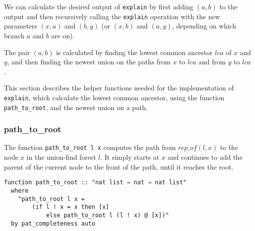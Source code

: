 \begin{center}
\end{center}

We can calculate the desired output of \lstinline|explain| by first adding  $(a, b)$ to the output and then recursively calling the \lstinline|explain| operation with the new parameters $(x, a)$ and $(b, y)$ (or $(x, b)$ and $(a, y)$, depending on which branch $a$ and $b$ are on).

The pair $(a, b)$ is calculated by finding the lowest common ancestor $lca$ of $x$ and $y$, and then finding the newest union on the paths from $x$ to $lca$ and from $y$ to $lca$.

This section describes the helper functions needed for the implementation of \lstinline|explain|, which calculate the lowest common ancestor, using the function \lstinline{path_to_root}, and the newest union on a path.

\subsubsection{path\_to\_root}
\label{subsubsection:path-to-root}

The function \lstinline{path_to_root l x} computes the path from $rep\_of(l,x)$ to the node $x$ in the union-find forest $l$. It simply starts at $x$ and continues to add the parent of the current node to the front of the path, until it reaches the root.

\begin{lstlisting}
function path_to_root :: "nat list ⇒ nat ⇒ nat list"
  where
    "path_to_root l x =
        (if l ! x = x then [x]
            else path_to_root l (l ! x) @ [x])"
  by pat_completeness auto
\end{lstlisting}

